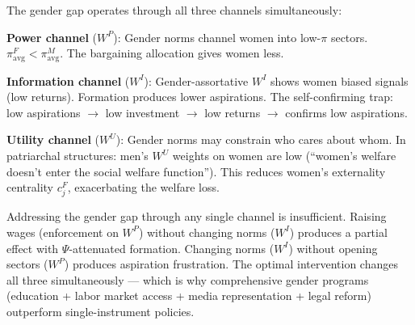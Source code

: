 \documentclass[../structural_economics_book.tex]{subfiles}
\begin{document}
\begin{keyinsight}
The gender gap operates through all three channels simultaneously:

\textbf{Power channel} ($W^P$): Gender norms channel women into low-$\pi$ sectors. $\pi^F_{\text{avg}} < \pi^M_{\text{avg}}$. The bargaining allocation gives women less.

\textbf{Information channel} ($W^I$): Gender-assortative $W^I$ shows women biased signals (low returns). Formation produces lower aspirations. The self-confirming trap: low aspirations $\to$ low investment $\to$ low returns $\to$ confirms low aspirations.

\textbf{Utility channel} ($W^U$): Gender norms may constrain who cares about whom. In patriarchal structures: men's $W^U$ weights on women are low (``women's welfare doesn't enter the social welfare function''). This reduces women's externality centrality $c^F_j$, exacerbating the welfare loss.

Addressing the gender gap through any single channel is insufficient. Raising wages (enforcement on $W^P$) without changing norms ($W^I$) produces a partial effect with $\Psi$-attenuated formation. Changing norms ($W^I$) without opening sectors ($W^P$) produces aspiration frustration. The optimal intervention changes all three simultaneously --- which is why comprehensive gender programs (education + labor market access + media representation + legal reform) outperform single-instrument policies.
\end{keyinsight}
\end{document}
